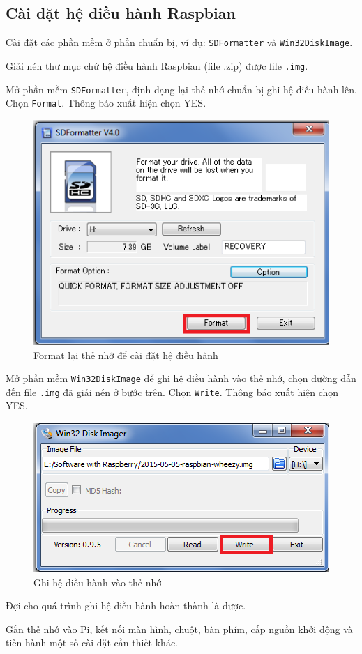 \subsection{Cài đặt hệ điều hành Raspbian}
\begin{list}{--}{}
\item Cài đặt các phần mềm ở phần chuẩn bị, ví dụ: \verb|SDFormatter| và \verb|Win32DiskImage|.
\item Giải nén thư mục chứ hệ điều hành Raspbian (file .zip) được file \verb|.img|.
\item Mở phần mềm \verb|SDFormatter|, định dạng lại thẻ nhớ chuẩn bị ghi hệ điều hành lên. Chọn \verb|Format|. Thông báo xuất hiện chọn YES.
\begin{figure}[!h]
\begin{center}
\includegraphics[scale=.4]{setup-os/images/SDFormatter}
\end{center}
\caption{Format lại thẻ nhớ để cài đặt hệ điều hành}
\end{figure}
\item Mở phần mềm \verb|Win32DiskImage| để ghi hệ điều hành vào thẻ nhớ, chọn đường dẫn đến file \verb|.img| đã giải nén ở bước trên. Chọn \verb|Write|. Thông báo xuất hiện chọn YES.
\begin{figure}[!h]
\begin{center}
\includegraphics[scale=.5]{setup-os/images/Win32DiskImage}
\end{center}
\caption{Ghi hệ điều hành vào thẻ nhớ}
\end{figure}
\item Đợi cho quá trình ghi hệ điều hành hoàn thành là được.
\item Gắn thẻ nhớ vào Pi, kết nối màn hình, chuột, bàn phím, cấp nguồn khởi động và tiến hành một số cài đặt cần thiết khác.
\end{list}
